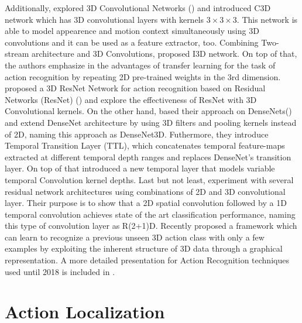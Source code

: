 \documentclass{report}
\begin{document}
Additionally, \cite{Tran2014LearningSF} explored 3D Convolutional Networks (\cite{pmid:22392705}) and introduced C3D network which  has
3D convolutional layers with kernels $ 3 \times 3 \times 3$.
This network is able to  model appearence and motion context simultaneously using 3D convolutions and it can be used as a feature extractor, too.
Combining Two-stream architecture and 3D Convolutions, \cite{DBLP:journals/corr/CarreiraZ17} proposed
I3D network. On top of that, the authors emphasize in the advantages of transfer learning for the task of action recognition by repeating 2D pre-trained weights
in the 3rd dimension. \cite{DBLP:journals/corr/abs-1708-07632} proposed a 3D ResNet Network for action recognition based on Residual Networks (ResNet)
(\cite{DBLP:journals/corr/HeZRS15}) and explore the effectiveness of ResNet with 3D Convolutional kernels.
On the other hand, \cite{DBLP:journals/corr/abs-1711-08200}  based their approach on DenseNets(\cite{DBLP:journals/corr/HuangLW16a}) and extend
DenseNet architecture by using 3D filters and pooling kernels instead of 2D, naming this approach as DenseNet3D. Futhermore, they introduce
Temporal Transition Layer (TTL), which concatenates temporal feature-maps extracted at different temporal depth ranges and replaces DenseNet's
transition layer. On top of that \cite{DBLP:DibaFSKAYG18} introduced  a new temporal layer that models variable  temporal Convolution kernel depths.
Last but not least, \cite{DBLP:journals/corr/abs-1711-11248} experiment with several residual network architectures using combinations of 2D and 3D convolutional layer. Their purpose is
to show that a 2D spatial convolution followed by a 1D temporal convolution achieves state of the art classification performance, naming
this type of convolution layer as R(2+1)D. 
Recently \cite{Guo_2018_ECCV} proposed a framework which can learn to recognize a previous unseen 3D action class with only a few examples
by exploiting the inherent structure of 3D data through a graphical representation. A more detailed presentation for Action Recognition techniques used until 2018 is included in
\cite{DBLP:journals/corr/abs-1806-11230}.
\section{Action Localization}
\end{document}
